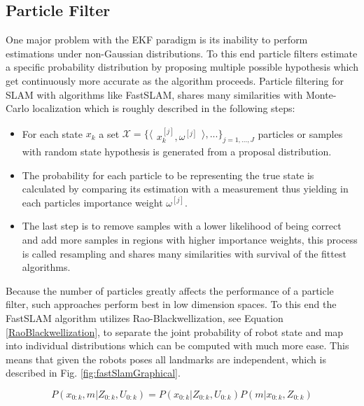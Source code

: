 
\subsection{Particle Filter}
One major problem with the EKF paradigm is its inability to perform estimations under non-Gaussian distributions. 
To this end particle filters estimate a specific probability distribution by proposing multiple possible hypothesis which get continuously more accurate as the algorithm proceeds. 
Particle filtering for SLAM with algorithms like FastSLAM, shares many similarities with Monte-Carlo localization which is roughly described in the following steps:
\begin{itemize}
	\item For each state $ x_{k} $ a set 
	$
	\mathcal{X} = 
	\{ 
	\langle
	\begin{matrix}
		 x_{k}^{[j]},  \omega^{[j]}
	\end{matrix}
	\rangle
	, ...
	\}
	_{j=1, ..., J}
	$
	particles or samples 
	with random state hypothesis is generated from a proposal distribution. 
	\item The probability for each particle to be representing the true state is calculated by comparing its estimation with a measurement thus yielding in each particles importance weight $ \omega^{[j]} $.
	\item The last step is to remove samples with a lower likelihood of being correct and add more samples in regions with higher importance weights, this process is called resampling and shares many similarities with survival of the fittest algorithms.
\end{itemize}

Because the number of particles greatly affects the performance of a particle filter, such approaches perform best in low dimension spaces. To this end the FastSLAM algorithm utilizes Rao-Blackwellization, see Equation \ref{RaoBlackwellization}, to separate the joint probability of robot state and map into individual distributions which can be computed with much more ease.
This means that given the robots poses all landmarks are independent, which is described in Fig. \ref{fig:fastSlamGraphical}.

\begin{equation}\label{RaoBlackwellization}
	P(x_{0:k}, m | Z_{0:k}, U_{0:k}) = P(x_{0:k} | Z_{0:k}, U_{0:k}) P(m | x_{0:k}, Z_{0:k})
\end{equation}

